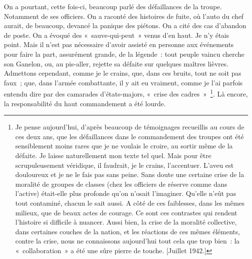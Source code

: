\documentclass[french,twoside]{book} %
\begin{document}
On a pourtant, cette fois-ci, beaucoup parlé des défaillances de la troupe. Notamment de ses officiers. On a raconté des histoires de fuite, où l’auto du chef aurait, de beaucoup, devancé la panique des piétons. On a cité des cas d’abandon de poste. On a évoqué des « sauve-qui-peut » venus d’en haut. Je n’y étais point. Mais il n’est pas nécessaire d’avoir assisté en personne aux événements pour faire la part, assurément grande, de la légende : tout peuple vaincu cherche son Ganelon, ou, au pis-aller, rejette sa défaite sur quelques maîtres lièvres. Admettons cependant, comme je le crains, que, dans ces bruits, tout ne soit pas faux ; que, dans l’armée combattante, il y ait eu vraiment, comme je l’ai parfois   entendu dire par des camarades d’états-majors, « crise des cadres » \footnote{Je pense aujourd’hui, d’après beaucoup de témoignages recueillis au cours de ces deux ans, que les défaillances dans le commandement des troupes ont été sensiblement moins rares que je ne voulais le croire, au sortir même de la défaite. Je laisse naturellement mon texte tel quel. Mais pour être scrupuleusement véridique, il faudrait, je le crains, l’accentuer. L’aveu est douloureux et je ne le fais pas sans peine. Sans doute une certaine crise de la moralité de groupes de classes (chez les officiers de réserve comme dans l’active) était-elle plus profonde qu’on n’osait l’imaginer. Qu’elle n’eût pas tout contaminé, chacun le sait aussi. A côté de ces faiblesses, dans les mêmes milieux, que de beaux actes de courage. Ce sont ces contrastes qui rendent l’histoire si difficile à nuancer. Aussi bien, la crise de la moralité collective, dans certaines couches de la nation, et les réactions de ces mêmes éléments, contre la crise, nous ne connaissons aujourd’hui tout cela que trop bien : la « collaboration » a été une sûre pierre de touche. [Juillet 1942.]}. Là encore, la responsabilité du haut commandement a été lourde.\par
\end{document}
